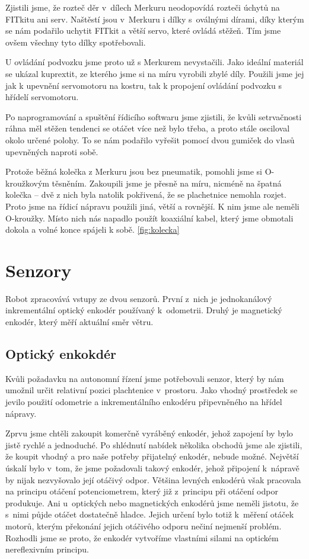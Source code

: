 Zjistili jsme, že rozteč děr v~dílech Merkuru neodopovídá rozteči úchytů na FITkitu ani serv. Naštěstí jsou v~Merkuru i dílky s~oválnými dírami, díky kterým se nám podařilo uchytit FITkit a větší servo, které ovládá stěžeň. Tím jsme ovšem všechny tyto dílky spotřebovali.

U ovládání podvozku jsme proto už s Merkurem nevystačili. Jako ideální materiál se ukázal kuprextit, ze kterého jsme si na míru vyrobili zbylé díly. Použili jsme jej jak k upevnění servomotoru na kostru, tak k propojení ovládání podvozku s hřídelí servomotoru.

Po naprogramování a spuštění řídicího softwaru jsme zjistili, že kvůli setrvačnosti ráhna měl stěžen tendenci se otáčet více než bylo třeba, a proto stále osciloval okolo určené polohy. To se nám podařilo vyřešit pomocí dvou gumiček do vlasů upevněných naproti sobě.

Protože běžná kolečka z Merkuru jsou bez pneumatik, pomohli jsme si O-kroužkovým těsněním. Zakoupili jsme je přesně na míru, nicméně na špatná kolečka -- dvě z nich byla natolik pokřivená, že se plachetnice nemohla rozjet. Proto jsme na řídicí nápravu použili jiná, větší a rovnější. K nim jsme ale neměli O-kroužky. Místo nich nás napadlo použít koaxiální kabel, který jsme obmotali dokola a volné konce spájeli k sobě. \ref{fig:kolecka}

\section{Senzory}
Robot zpracovává vstupy ze dvou senzorů. První z~nich je jednokanálový inkrementální optický enkodér používaný k~odometrii. Druhý je magnetický enkodér, který měří aktuální směr větru.

\subsection{Optický enkokdér}
Kvůli požadavku na autonomní řízení jsme potřebovali senzor, který by nám umožnil určit relativní pozici plachtenice v~prostoru. Jako vhodný prostředek se jevilo použití odometrie a inkrementálního enkodéru připevněného na hřídel nápravy.

Zprvu jsme chtěli zakoupit komerčně vyráběný enkodér, jehož zapojení by bylo jistě rychlé a jednoduché. Po shlédnutí nabídek několika obchodů jsme ale zjistili, že koupit vhodný a pro naše potřeby přijatelný enkodér, nebude možné. Největší úskalí bylo v~tom, že jsme požadovali takový enkodér, jehož připojení k~nápravě by nijak nezvyšovalo její otáčivý odpor. Většina levných enkodérů však pracovala na principu otáčení potenciometrem, který již z~principu při otáčení odpor produkuje. Ani u~optických nebo magnetických enkodérů jsme neměli jistotu, že s~nimi půjde otáčet dostatečně hladce. Jejich určení bylo totiž k~měření otáček motorů, kterým překonání jejich otáčivého odporu nečiní nejmenší problém. Rozhodli jsme se proto, že enkodér vytvoříme vlastními silami na optickém nereflexivním principu.

